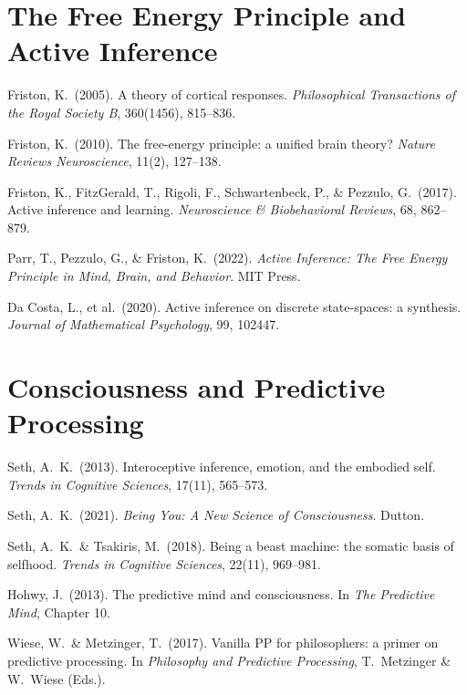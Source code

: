 \documentclass[11pt,a4paper]{report}
\begin{document}
\section*{The Free Energy Principle and Active Inference}
\begin{enumerate}[label={[\arabic*]}, leftmargin=2.5em, start=6]
  \item Friston, K.\ (2005). A theory of cortical responses. \textit{Philosophical Transactions of the Royal Society B}, 360(1456), 815--836.
  \item Friston, K.\ (2010). The free-energy principle: a unified brain theory? \textit{Nature Reviews Neuroscience}, 11(2), 127--138.
  \item Friston, K., FitzGerald, T., Rigoli, F., Schwartenbeck, P., \& Pezzulo, G.\ (2017). Active inference and learning. \textit{Neuroscience \& Biobehavioral Reviews}, 68, 862--879.
  \item Parr, T., Pezzulo, G., \& Friston, K.\ (2022). \textit{Active Inference: The Free Energy Principle in Mind, Brain, and Behavior}. MIT Press.
  \item Da Costa, L., et al.\ (2020). Active inference on discrete state-spaces: a synthesis. \textit{Journal of Mathematical Psychology}, 99, 102447.
\end{enumerate}

\section*{Consciousness and Predictive Processing}
\begin{enumerate}[label={[\arabic*]}, leftmargin=2.5em, start=11]
  \item Seth, A.\ K.\ (2013). Interoceptive inference, emotion, and the embodied self. \textit{Trends in Cognitive Sciences}, 17(11), 565--573.
  \item Seth, A.\ K.\ (2021). \textit{Being You: A New Science of Consciousness}. Dutton.
  \item Seth, A.\ K.\ \& Tsakiris, M.\ (2018). Being a beast machine: the somatic basis of selfhood. \textit{Trends in Cognitive Sciences}, 22(11), 969--981.
  \item Hohwy, J.\ (2013). The predictive mind and consciousness. In \textit{The Predictive Mind}, Chapter 10.
  \item Wiese, W.\ \& Metzinger, T.\ (2017). Vanilla PP for philosophers: a primer on predictive processing. In \textit{Philosophy and Predictive Processing}, T.\ Metzinger \& W.\ Wiese (Eds.).
\end{enumerate}
\end{document}

